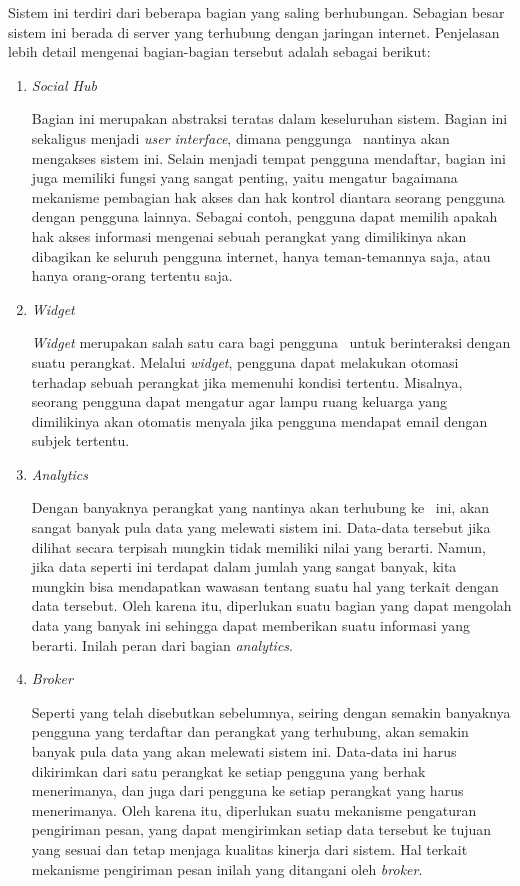 Sistem ini terdiri dari beberapa bagian yang saling berhubungan. Sebagian besar sistem ini berada di server yang terhubung dengan jaringan internet. Penjelasan lebih detail mengenai bagian-bagian tersebut adalah sebagai berikut:
\begin{enumerate}
	\item \textit{Social Hub}
	
	Bagian ini merupakan abstraksi teratas dalam keseluruhan sistem. Bagian ini sekaligus menjadi \textit{user interface}, dimana penggunga \plat~nantinya akan mengakses sistem ini. Selain menjadi tempat pengguna mendaftar, bagian ini juga memiliki fungsi yang sangat penting, yaitu mengatur bagaimana mekanisme pembagian hak akses dan hak kontrol diantara seorang pengguna dengan pengguna lainnya. Sebagai contoh, pengguna dapat memilih apakah hak akses informasi mengenai sebuah perangkat yang dimilikinya akan dibagikan ke seluruh pengguna internet, hanya teman-temannya saja, atau hanya orang-orang tertentu saja.
	
	\item \textit{Widget}
	
	\textit{Widget} merupakan salah satu cara bagi pengguna \plat~untuk berinteraksi dengan suatu perangkat. Melalui \textit{widget}, pengguna dapat melakukan otomasi terhadap sebuah perangkat jika memenuhi kondisi tertentu. Misalnya, seorang pengguna dapat mengatur agar lampu ruang keluarga yang dimilikinya akan otomatis menyala jika pengguna mendapat email dengan subjek tertentu.
	
	\item \textit{Analytics}
	
	Dengan banyaknya perangkat yang nantinya akan terhubung ke \plat~ini, akan sangat banyak pula data yang melewati sistem ini. Data-data tersebut jika dilihat secara terpisah mungkin tidak memiliki nilai yang berarti. Namun, jika data seperti ini terdapat dalam jumlah yang sangat banyak, kita mungkin bisa mendapatkan wawasan tentang suatu hal yang terkait dengan data tersebut. Oleh karena itu, diperlukan suatu bagian yang dapat mengolah data yang banyak ini sehingga dapat memberikan suatu informasi yang berarti. Inilah peran dari bagian \textit{analytics}.
	
	\item \textit{Broker}
	
	Seperti yang telah disebutkan sebelumnya, seiring dengan semakin banyaknya pengguna yang terdaftar dan perangkat yang terhubung, akan semakin banyak pula data yang akan melewati sistem ini. Data-data ini harus dikirimkan dari satu perangkat ke setiap pengguna yang berhak menerimanya, dan juga dari pengguna ke setiap perangkat yang harus menerimanya. Oleh karena itu, diperlukan suatu mekanisme pengaturan pengiriman pesan, yang dapat mengirimkan setiap data tersebut ke tujuan yang sesuai dan tetap menjaga kualitas kinerja dari sistem. Hal terkait mekanisme pengiriman pesan inilah yang ditangani oleh \textit{broker}.
	

\end{enumerate}
